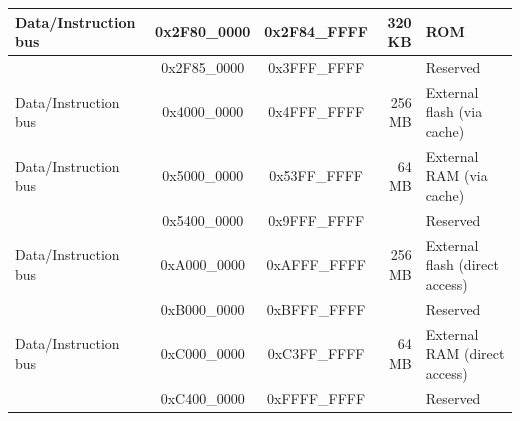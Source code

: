 \begin{ThreePartTable}
\begin{longtable}[c]{|p{3.5cm}|c|c|r|p{3.2cm}| }
        {Data/Instruction bus} & 0x2F80\_0000 & 0x2F84\_FFFF & 320 KB & ROM\tnote{*}  \\\hline
        \rowcolor{gray!25}  & 0x2F85\_0000 & 0x3FFF\_FFFF &        & Reserved      \\\hline
        {Data/Instruction bus} & 0x4000\_0000 & 0x4FFF\_FFFF & 256 MB & External flash (via cache) \\\hline
        {Data/Instruction bus} & 0x5000\_0000 & 0x53FF\_FFFF & 64 MB  & External RAM (via cache) \\\hline
        \rowcolor{gray!25}  & 0x5400\_0000 & 0x9FFF\_FFFF &        & Reserved      \\\hline
        {Data/Instruction bus} & 0xA000\_0000 & 0xAFFF\_FFFF & 256 MB & External flash (direct access) \\\hline
        \rowcolor{gray!25}  & 0xB000\_0000 & 0xBFFF\_FFFF &        & Reserved      \\\hline        
        {Data/Instruction bus} & 0xC000\_0000 & 0xC3FF\_FFFF & 64 MB  & External RAM (direct access) \\\hline        
        \rowcolor{gray!25}  & 0xC400\_0000 & 0xFFFF\_FFFF &        & Reserved      \\\hline
        
\end{longtable}
\end{ThreePartTable}

